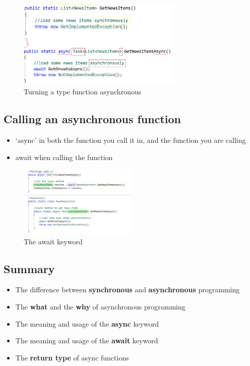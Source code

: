 \documentclass{article}
\newcommand{\bold}[1]{\textbf{#1}}
\begin{document}
\begin{figure}[H]
    \centering
    \includegraphics[width=0.7\textwidth]{async-type.png}
    \caption{Turning a type function asynchronous}
\end{figure}

\subsection{Calling an asynchronous function}

\begin{itemize}
    \item `async' in both the function you call it in, and the function you are calling
    \item await when calling the function
\end{itemize}

\begin{figure}[H]
    \centering
    \includegraphics[width=0.5\textwidth]{async-calling.png}
    \caption{The await keyword}
\end{figure}

\subsection{Summary}
\begin{itemize}
    \item The difference between \bold{synchronous} and \bold{asynchronous} programming
    \item The \bold{what} and the \bold{why} of asynchronous programming
    \item The meaning and usage of the \bold{async} keyword
    \item The meaning and usage of the \bold{await} keyword
    \item The \bold{return type} of async functions
\end{itemize}
\end{document}
